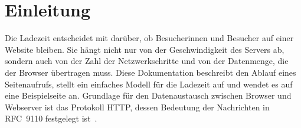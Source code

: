 \section{Einleitung}
\label{sec:einleitung}

Die Ladezeit entscheidet mit darüber, ob Besucherinnen und Besucher auf einer
Website bleiben. Sie hängt nicht nur von der Geschwindigkeit des Servers ab,
sondern auch von der Zahl der Netzwerkschritte und von der Datenmenge, die der
Browser übertragen muss. Diese Dokumentation beschreibt den Ablauf eines
Seitenaufrufs, stellt ein einfaches Modell für die Ladezeit auf und wendet es
auf eine Beispielseite an. Grundlage für den Datenaustausch zwischen Browser
und Webserver ist das Protokoll HTTP, dessen Bedeutung der Nachrichten in
RFC~9110 festgelegt ist~\cite{rfc9110}.
